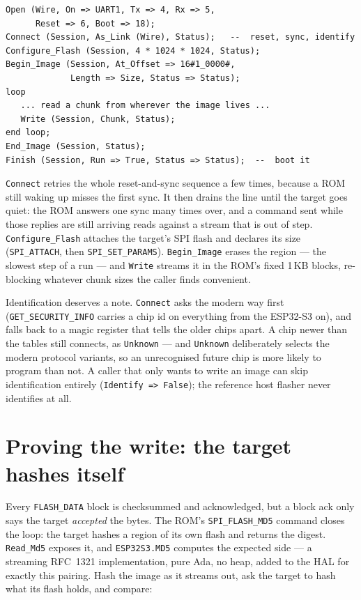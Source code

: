 \begin{lstlisting}
Open (Wire, On => UART1, Tx => 4, Rx => 5,
      Reset => 6, Boot => 18);
Connect (Session, As_Link (Wire), Status);   --  reset, sync, identify
Configure_Flash (Session, 4 * 1024 * 1024, Status);
Begin_Image (Session, At_Offset => 16#1_0000#,
             Length => Size, Status => Status);
loop
   ... read a chunk from wherever the image lives ...
   Write (Session, Chunk, Status);
end loop;
End_Image (Session, Status);
Finish (Session, Run => True, Status => Status);  --  boot it
\end{lstlisting}

\texttt{Connect} retries the whole reset-and-sync sequence a few times, because
a ROM still waking up misses the first sync. It then drains the line until the
target goes quiet: the ROM answers one sync many times over, and a command sent
while those replies are still arriving reads against a stream that is out of
step. \texttt{Configure\_Flash} attaches the target's SPI flash and declares
its size (\texttt{SPI\_ATTACH}, then \texttt{SPI\_SET\_PARAMS}).
\texttt{Begin\_Image} erases the region --- the slowest step of a run --- and
\texttt{Write} streams it in the ROM's fixed 1\,KB blocks, re-blocking whatever
chunk sizes the caller finds convenient.

Identification deserves a note. \texttt{Connect} asks the modern way first
(\texttt{GET\_SECURITY\_INFO} carries a chip id on everything from the
ESP32-S3 on), and falls back to a magic register that tells the older chips
apart. A chip newer than the tables still connects, as \texttt{Unknown} ---
and \texttt{Unknown} deliberately selects the modern protocol variants, so an
unrecognised future chip is more likely to program than not. A caller that
only wants to write an image can skip identification entirely
(\texttt{Identify => False}); the reference host flasher never identifies at
all.

\section{Proving the write: the target hashes itself}

Every \texttt{FLASH\_DATA} block is checksummed and acknowledged, but a block
ack only says the target \emph{accepted} the bytes. The ROM's
\texttt{SPI\_FLASH\_MD5} command closes the loop: the target hashes a region of
its own flash and returns the digest. \texttt{Read\_Md5} exposes it, and
\texttt{ESP32S3.MD5} computes the expected side --- a streaming RFC~1321
implementation, pure Ada, no heap, added to the HAL for exactly this pairing.
Hash the image as it streams out, ask the target to hash what its flash holds,
and compare:

